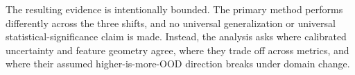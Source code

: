 The resulting evidence is intentionally bounded. The primary method performs differently across the three shifts, and no universal generalization or universal statistical-significance claim is made. Instead, the analysis asks where calibrated uncertainty and feature geometry agree, where they trade off across metrics, and where their assumed higher-is-more-OOD direction breaks under domain change.
